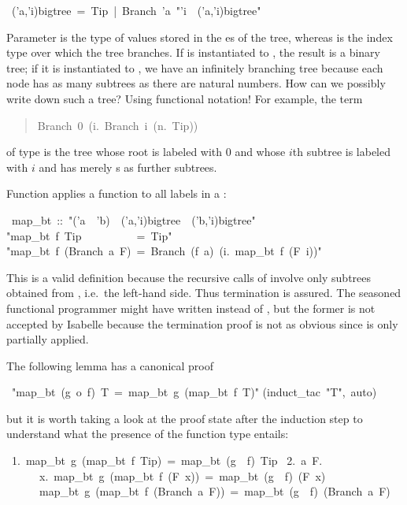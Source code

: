 \begin{isabelle}%
\ ('a,'i)bigtree\ =\ Tip\ |\ Branch\ 'a\ {"}'i\ {\isasymRightarrow}\ ('a,'i)bigtree{"}%
\begin{isamarkuptext}%
\noindent Parameter  is the type of values stored in
the es of the tree, whereas  is the index
type over which the tree branches. If  is instantiated to
, the result is a binary tree; if it is instantiated to
, we have an infinitely branching tree because each node
has as many subtrees as there are natural numbers. How can we possibly
write down such a tree? Using functional notation! For example, the term
\begin{quote}

\begin{isabelle}%
Branch\ 0\ ({\isasymlambda}i.\ Branch\ i\ ({\isasymlambda}n.\ Tip))
\end{isabelle}%

\end{quote}
of type  is the tree whose
root is labeled with 0 and whose $i$th subtree is labeled with $i$ and
has merely s as further subtrees.

Function  applies a function to all labels in a :%
\end{isamarkuptext}%
\ map\_bt\ ::\ {"}('a\ {\isasymRightarrow}\ 'b)\ {\isasymRightarrow}\ ('a,'i)bigtree\ {\isasymRightarrow}\ ('b,'i)bigtree{"}\isanewline
{}\isanewline
{"}map\_bt\ f\ Tip\ \ \ \ \ \ \ \ \ \ =\ Tip{"}\isanewline
{"}map\_bt\ f\ (Branch\ a\ F)\ =\ Branch\ (f\ a)\ ({\isasymlambda}i.\ map\_bt\ f\ (F\ i)){"}%
\begin{isamarkuptext}%
\noindent This is a valid  definition because the
recursive calls of  involve only subtrees obtained from
, i.e.\ the left-hand side. Thus termination is assured.  The
seasoned functional programmer might have written 
instead of , but the former is not accepted by
Isabelle because the termination proof is not as obvious since
 is only partially applied.

The following lemma has a canonical proof%
\end{isamarkuptext}%
\ {"}map\_bt\ (g\ o\ f)\ T\ =\ map\_bt\ g\ (map\_bt\ f\ T){"}\isanewline
{}(induct\_tac\ {"}T{"},\ auto)%
\begin{isamarkuptext}%
\noindent
but it is worth taking a look at the proof state after the induction step
to understand what the presence of the function type entails:
\begin{isabellepar}%
~1.~map\_bt~g~(map\_bt~f~Tip)~=~map\_bt~(g~{\isasymcirc}~f)~Tip\isanewline
~2.~{\isasymAnd}a~F.\isanewline
~~~~~~{\isasymforall}x.~map\_bt~g~(map\_bt~f~(F~x))~=~map\_bt~(g~{\isasymcirc}~f)~(F~x)~{\isasymLongrightarrow}\isanewline
~~~~~~map\_bt~g~(map\_bt~f~(Branch~a~F))~=~map\_bt~(g~{\isasymcirc}~f)~(Branch~a~F)%
\end{isabellepar}%
\end{isamarkuptext}%
\end{isabelle}%
